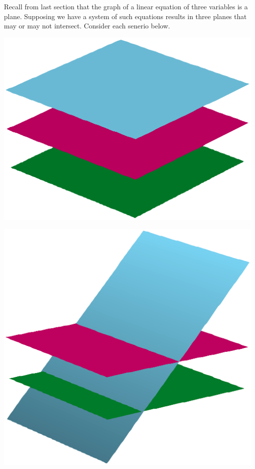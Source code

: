 \documentclass{report}
\theoremstyle{definition}
\begin{document}
Recall from last section that the graph of a linear equation of three variables is a plane. Supposing we have a system of such equations results in three planes that may or may not intersect. Consider each senerio below.

\vspace{-0.5cm}

\begin{center}
\end{center}

\vspace{-0.5cm}
\begin{minipage}{0.3\linewidth}
	\begin{center}
		\includegraphics[scale=0.25]{ParallelPlanes.eps}
	\end{center}
\end{minipage}
\hfill
\begin{minipage}{0.3\linewidth}
	\begin{center}
		\includegraphics[scale=0.25]{TransversalPlane.eps}
	\end{center}
\end{minipage}
\end{document}
